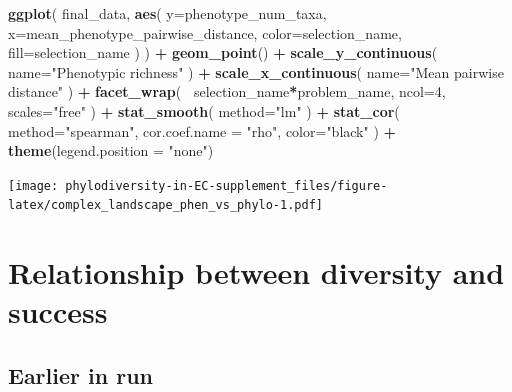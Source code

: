 \documentclass[]{book}
\newenvironment{Shaded}{\begin{snugshade}}{\end{snugshade}}
\newcommand{\DataTypeTok}[1]{\textcolor[rgb]{0.13,0.29,0.53}{#1}}
\newcommand{\DecValTok}[1]{\textcolor[rgb]{0.00,0.00,0.81}{#1}}
\newcommand{\KeywordTok}[1]{\textcolor[rgb]{0.13,0.29,0.53}{\textbf{#1}}}
\newcommand{\NormalTok}[1]{#1}
\newcommand{\OperatorTok}[1]{\textcolor[rgb]{0.81,0.36,0.00}{\textbf{#1}}}
\newcommand{\StringTok}[1]{\textcolor[rgb]{0.31,0.60,0.02}{#1}}
\begin{document}
\begin{Shaded}
\begin{Highlighting}[]
\KeywordTok{ggplot}\NormalTok{(}
\NormalTok{    final_data,}
    \KeywordTok{aes}\NormalTok{(}
        \DataTypeTok{y=}\NormalTok{phenotype_num_taxa,}
        \DataTypeTok{x=}\NormalTok{mean_phenotype_pairwise_distance,}
        \DataTypeTok{color=}\NormalTok{selection_name,}
        \DataTypeTok{fill=}\NormalTok{selection_name}
\NormalTok{    )}
\NormalTok{  ) }\OperatorTok{+}
\StringTok{  }\KeywordTok{geom_point}\NormalTok{() }\OperatorTok{+}
\StringTok{    }\KeywordTok{scale_y_continuous}\NormalTok{(}
        \DataTypeTok{name=}\StringTok{"Phenotypic richness"}
\NormalTok{  ) }\OperatorTok{+}
\StringTok{  }\KeywordTok{scale_x_continuous}\NormalTok{(}
        \DataTypeTok{name=}\StringTok{"Mean pairwise distance"}
\NormalTok{  ) }\OperatorTok{+}\StringTok{ }
\StringTok{  }\KeywordTok{facet_wrap}\NormalTok{(}
      \OperatorTok{~}\NormalTok{selection_name}\OperatorTok{*}\NormalTok{problem_name, }\DataTypeTok{ncol=}\DecValTok{4}\NormalTok{, }\DataTypeTok{scales=}\StringTok{"free"}
\NormalTok{  ) }\OperatorTok{+}\StringTok{ }
\StringTok{  }\KeywordTok{stat_smooth}\NormalTok{(}
    \DataTypeTok{method=}\StringTok{"lm"}
\NormalTok{  ) }\OperatorTok{+}\StringTok{ }
\StringTok{  }\KeywordTok{stat_cor}\NormalTok{(}
    \DataTypeTok{method=}\StringTok{"spearman"}\NormalTok{, }\DataTypeTok{cor.coef.name =} \StringTok{"rho"}\NormalTok{, }\DataTypeTok{color=}\StringTok{"black"}
\NormalTok{  ) }\OperatorTok{+}
\StringTok{  }\KeywordTok{theme}\NormalTok{(}\DataTypeTok{legend.position =} \StringTok{"none"}\NormalTok{)}
\end{Highlighting}
\end{Shaded}

\texttt{[image: phylodiversity-in-EC-supplement\_files/figure-latex/complex\_landscape\_phen\_vs\_phylo-1.pdf]}

\hypertarget{relationship-between-diversity-and-success-1}{%
\section{Relationship between diversity and success}\label{relationship-between-diversity-and-success-1}}

\hypertarget{earlier-in-run}{%
\subsection{Earlier in run}\label{earlier-in-run}}
\end{document}
